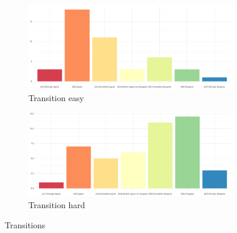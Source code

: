 \begin{figure}
	\centering
	\begin{subfigure}{0.48\textwidth}
		\includegraphics[width=\textwidth]{./_StudyResults/transitionEasy}
		\caption{Transition easy}
		\label{fig:transitionEasy}
	\end{subfigure}%
	\hfill
	\begin{subfigure}{0.48\textwidth}
		\includegraphics[width=\textwidth]{./_StudyResults/transitionHard}
		\caption{Transition hard}
		\label{fig:transitionHard}
	\end{subfigure}
	\caption{Transitions} %
\end{figure}

